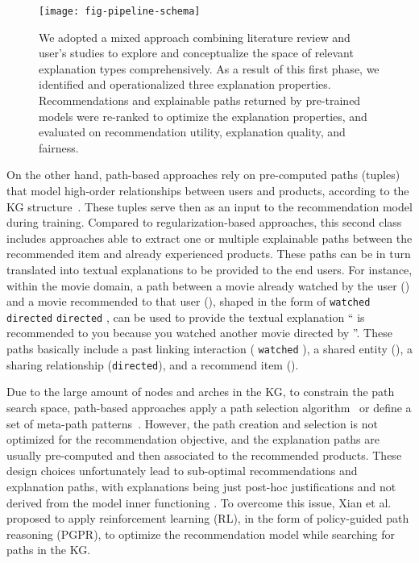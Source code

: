 \documentclass[sigconf]{acmart}
\begin{document}
\begin{figure*}
\centering
\texttt{[image: fig-pipeline-schema]}
\vspace{-8mm}
\caption{We adopted a mixed approach combining literature review and user's studies to explore and conceptualize the space of relevant explanation types comprehensively. As a result of this first phase, we identified and operationalized three explanation properties. Recommendations and explainable paths returned by pre-trained models were re-ranked to optimize the explanation properties, and evaluated on recommendation utility, explanation quality, and fairness.} 
\label{fig:path-img}
\end{figure*}

On the other hand, path-based approaches rely on pre-computed paths (tuples) that model high-order relationships between users and products, according to the KG structure~\cite{he2017neural,ripple-net/10.1145/3269206.3271739, Wang_Wang_Xu_He_Cao_Chua_2019, 10.1145/3219819.3219965,10.1109/TKDE.2018.2833443}.
These tuples serve then as an input to the recommendation model during training. 
Compared to regularization-based approaches, this second class includes approaches able to extract one or multiple explainable paths between the recommended item and already experienced products. 
These paths can be in turn translated into textual explanations to be provided to the end users. 
For instance, within the movie domain, a path between a movie already watched by the user () and a movie recommended to that user (), shaped in the form of  \texttt{watched}  \texttt{directed}  \texttt{directed} , can be used to provide the textual explanation `` is recommended to you because you watched another movie directed by ''.  These paths basically include a past linking interaction ( \texttt{watched} ), a shared entity (), a sharing relationship (\texttt{directed}), and a recommend item (). 

\vspace{1mm}  
Due to the large amount of nodes and arches in the KG, to constrain the path search space, path-based approaches  apply a path selection algorithm~\cite{he2017neural,ripple-net/10.1145/3269206.3271739, Wang_Wang_Xu_He_Cao_Chua_2019, XianFMMZ19} or define a set of meta-path patterns~\cite{10.1145/3219819.3219965,10.1109/TKDE.2018.2833443}. 
{\color{black} However, the path creation and selection is not optimized for the recommendation objective, and the explanation paths are usually pre-computed and then associated to the recommended products. These design choices unfortunately lead to sub-optimal recommendations and explanation paths, with explanations being just post-hoc justifications and not derived from the model inner functioning \cite{4648950}.}  
To overcome this issue, Xian et al.~\cite{XianFMMZ19} proposed to apply reinforcement learning (RL), in the form of policy-guided path reasoning (PGPR), to optimize the recommendation model while searching for paths in the KG. 
\end{document}
